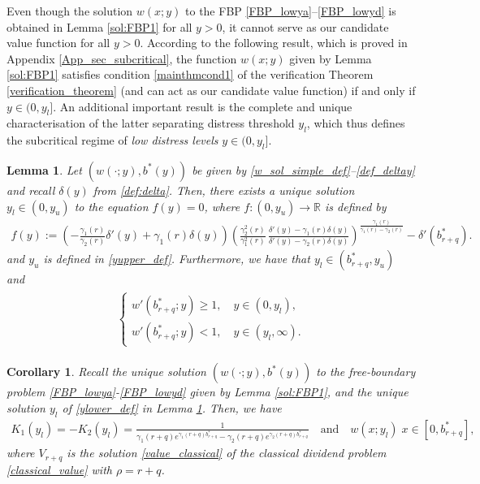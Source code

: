 \documentclass[11pt]{article} %
\newtheorem{corollary}[theorem]{Corollary}
\newtheorem{lemma}[theorem]{Lemma}
\def\R{\mathbb{R}}
\numberwithin{komcounter}{section}
\numberwithin{equation}{section}
\numberwithin{theorem}{section}
\begin{document}
Even though the solution $w(x;y)$ to the FBP \eqref{FBP_lowya}--\eqref{FBP_lowyd} is obtained in Lemma \ref{sol:FBP1} for all $y>0$, it cannot serve as our candidate value function for all $y>0$. 
According to the following result, which is proved in Appendix \ref{App_sec_subcritical}, the function $w(x;y)$ given by Lemma \ref{sol:FBP1} satisfies condition \eqref{mainthmcond1} of the verification Theorem \ref{verification_theorem} (and can act as our candidate value function) if and only if $y \in (0,y_l]$. 
An additional important result is the complete and unique characterisation of the latter separating distress threshold $y_l$, which thus defines the subcritical regime of {\it low distress levels} $y \in (0,y_l]$. 


\begin{lemma}\label{lemma_yl}
Let $(w(\cdot;y),b^*(y))$ be given by \eqref{w_sol_simple_def}--\eqref{def_deltay} and recall $\delta(y)$ from \eqref{def:delta}. 
Then, there exists a unique solution $y_l \in (0,y_u)$ to the equation $f(y) = 0$, where $f:(0,y_u) \to \R$ is defined by
\begin{align} \label{ylower_eq_charac} 
f(y) := \left(- \frac{\gamma_1(r)}{\gamma_2(r)}\delta'(y) + \gamma_1(r)\delta(y) \right) \left(\frac{\gamma_2^2(r)}{\gamma_1^2(r)} \, \frac{\delta'(y) - \gamma_1(r) \delta(y)}{\delta'(y) - \gamma_2(r) \delta(y)} \right)^{\frac{\gamma_1(r)}{\gamma_1(r) - \gamma_2(r)}} - \delta'(b^*_{r+q}) .
\end{align}
and $y_u$ is defined in \eqref{yupper_def}. 
Furthermore, we have that $y_l\in (b^*_{r+q},y_u)$ and 
\begin{align} \label{ylower_def}
\begin{split}
\begin{cases}
w'(b^*_{r+q};y)\geq 1,\quad y\in (0,y_l),\\
w'(b^*_{r+q};y)< 1,\quad y\in (y_l,\infty).
\end{cases}
\end{split}
\end{align}
\end{lemma}

\begin{corollary} \label{help_corr}
Recall the unique solution $(w(\cdot;y),b^*(y))$ to the free-boundary problem \eqref{FBP_lowya}-\eqref{FBP_lowyd} given by Lemma \ref{sol:FBP1}, and the unique solution $y_l$ of \eqref{ylower_def} in Lemma \ref{lemma_yl}. 
Then, we have 
\begin{align*}
K_1(y_l) = - K_2(y_l) = \frac{1}{\gamma_1(r+q) e^{\gamma_1(r+q) b^*_{r+q}} - \gamma_2(r+q) e^{\gamma_2(r+q)b^*_{r+q}}} 
\quad \text{and} \quad 
w(x;y_l)
\;  x \in [0,b^*_{r+q}],
\end{align*}
where $V_{r+q}$ is the solution \eqref{value_classical} of the classical dividend problem \eqref{classical_value} with $\rho = r+q$.
\end{corollary}
\end{document}
